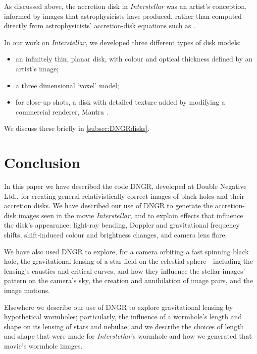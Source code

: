 \documentclass[12pt]{iopart}
\begin{document}
 As discussed above, the accretion disk in \emph{Interstellar} was an artist's conception,
 informed by images that astrophysicists have produced, rather than computed directly
 from astrophysicists' accretion-disk equations such as \cite{NovikovThorne}.
 
 In our work on \emph{Interstellar}, we developed three different types of disk models:
\begin{itemize}
\item
an infinitely thin, planar disk, with colour and optical thickness defined by an artist's image;
\item a three dimensional `voxel' model;
\item
for close-up shots, a disk with detailed texture added by modifying a
commercial renderer, Mantra \cite{MANTRA}.
\end{itemize}
We discuss these briefly in \ref{subsec:DNGRdisks}.






\section{Conclusion}
\label{sec:Conclusion}

In this paper we have described the code DNGR, developed at Double Negative
Ltd., for creating general relativistically correct images of black holes
and their accretion disks.  We have described our use of DNGR to generate 
the accretion-disk images
seen in the movie \emph{Interstellar}, and to explain effects that influence  the disk's
appearance: light-ray bending, Doppler and gravitational frequency shifts, 
shift-induced colour and brightness changes, and camera lens flare.

We have also used DNGR to explore, for a camera orbiting a fast spinning black hole,  the gravitational lensing of a star field on the celestial sphere---including the lensing's
caustics and critical curves,  and how they influence the stellar images' 
pattern on the camera's sky, the creation and
annihilation of image pairs, and the image motions.  

Elsewhere \cite{DNGRwormhole} we describe our use of DNGR to explore gravitational lensing by hypothetical wormholes; particularly, the influence of a wormhole's 
length and shape on its lensing of stars and nebulae; and we describe the choices of 
length and shape  that were made for \emph{Interstellar}'s wormhole and how we 
generated
that movie's wormhole images.
\end{document}
